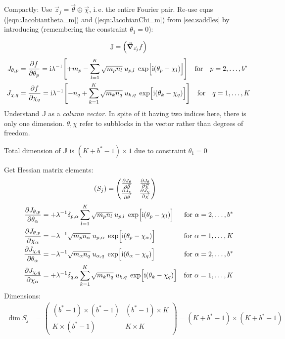 \documentclass[
	english,
	a4paper,
	fontsize=10pt,
	parskip=half,
	titlepage=true,
	DIV=12,
	final
]{scrreprt}
\newcommand*{\ie}{i.\,e.\xspace}
\newcommand*{\iunit}{\ensuremath{\mathrm{i}}}
\begin{document}
Compactly: Use $\vec{z}_j = \vec{\theta} \oplus \vec{\chi}$, \ie the entire Fourier pair. Re-use eqns (\ref{eqn:Jacobiantheta_m}) and (\ref{eqn:JacobianChi_m}) from \ref{sec:saddles} by introducing (remembering the constraint $\theta_1 = 0$):

\begin{align}
	\mathbb{J} = \qty( \grad_{\vec{z}_j} f )
\end{align}
\begin{align}
	J_{\theta, p} 
&= 
	\pdv{f}{\theta_p}
=
	\iunit \lambda^{-1}
	\qty[
		+m_p
		-
		\sum_{l=1}^{K}
			\sqrt{m_p n_l} \; u_{p,l} \; \exp[\Big. \iunit(\theta_p - \chi_l)]
	]
\qfor{} p = 2, \ldots, b^*
\\
	J_{\chi, q} 
&= 
	\pdv{f}{\chi_q}
=
	\iunit \lambda^{-1}
	\qty[
		-n_q
		+
		\sum_{k=1}^{K}
			\sqrt{m_k n_q} \; u_{k,q} \; \exp[\Big. \iunit(\theta_k - \chi_q)]
	]
\qfor{} q = 1, \ldots, K
\end{align}
Understand $\mathbb{J}$ as a \emph{column vector}. In spite of it having two indices here, there is only one dimension. $\theta, \chi$ refer to subblocks in the vector rather than degrees of freedom.

Total dimension of $\mathbb{J}$ is $(K + b^* - 1) \times 1$ due to constraint $\theta_1 = 0$

Get Hessian matrix elements:
\begin{align}
	\qty( S_j )
&=
	\begin{pmatrix}
		\pdv{J_{\theta}}{\vec{\theta}} &
		\pdv{J_{\theta}}{\vec{\chi  }} 
		\\
		\pdv{J_{\chi  }}{\vec{\theta}} &
		\pdv{J_{\chi  }}{\vec{\chi  }} 
	\end{pmatrix}
\end{align}
\begin{align}
	\pdv{J_{\theta, p}}{\theta_{\alpha}}
&=
	+
	\lambda^{-1}
	\delta_{p,\alpha}
	\sum_{l=1}^{K}
		\sqrt{m_p n_l} \; u_{p,l} \; \exp[\Big. \iunit(\theta_p - \chi_l)]
&\text{for } \alpha = 2, \ldots, b^*
\\
	\pdv{J_{\theta, p}}{\chi_{\alpha}}
&=
	-
	\lambda^{-1}
	\sqrt{m_p n_\alpha} \; u_{p,\alpha} \; \exp[\Big. \iunit(\theta_p - \chi_\alpha)]
&\text{for } \alpha = 1, \ldots, K
\\
	\pdv{J_{\chi, q}}{\theta_{\alpha}}
&=
	-
	\lambda^{-1}
	\sqrt{m_\alpha n_q} \; u_{\alpha,q} \; \exp[\Big. \iunit(\theta_\alpha - \chi_q)]
&\text{for } \alpha = 2, \ldots, b^*
\\
	\pdv{J_{\chi, q}}{\chi_{\alpha}}
&=
	+
	\lambda^{-1}
	\delta_{q,\alpha}
	\sum_{k=1}^{K}
		\sqrt{m_k n_q} \; u_{k,q} \; \exp[\Big. \iunit(\theta_k - \chi_q)]
&\text{for } \alpha = 1, \ldots, K
\end{align}
Dimensions:
\begin{align}
	\dim S_j
&=
	\begin{pmatrix}
		(b^* - 1) \times (b^* - 1)	& (b^* - 1) \times K \\
		K \times (b^* - 1)			& K \times K
	\end{pmatrix}
=
	(K + b^* - 1) \times (K + b^* - 1)
\end{align}
\end{document}
